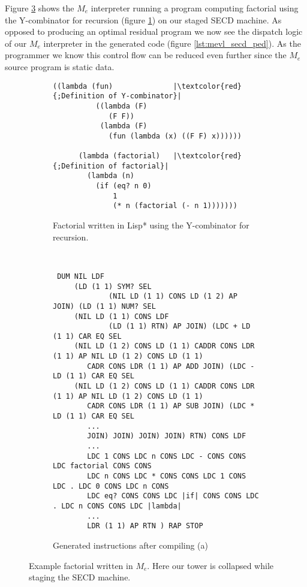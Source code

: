\documentclass[a4paper,12pt,twoside,openright]{report}
\theoremstyle{definition}
\newcommand{\mevl}{$M_{e}$}
\begin{document}
Figure \ref{lst:mevl_secd_all} shows the \mevl{} interpreter running a program computing factorial using the Y-combinator for recursion (figure \ref{lst:mevl_secd_lisp}) on our staged SECD machine. As opposed to producing an optimal residual program we now see the dispatch logic of our \mevl{} interpreter in the generated code (figure \ref{lst:mevl_secd_ped}). As the programmer we know this control flow can be reduced even further since the \mevl{} source program is static data.


\begin{figure}[htp!]
\centering
    \begin{subfigure}{.5\linewidth}
         \centering
         \begin{verbatim}
((lambda (fun)              |\textcolor{red}{;Definition of Y-combinator}|
          ((lambda (F)
             (F F))
           (lambda (F)
             (fun (lambda (x) ((F F) x))))))

      (lambda (factorial)   |\textcolor{red}{;Definition of factorial}|
        (lambda (n)
          (if (eq? n 0)
              1
              (* n (factorial (- n 1)))))))
         \end{verbatim}
         \caption{Factorial written in Lisp* using the Y-combinator for recursion.}
         \label{lst:mevl_secd_lisp}
    \end{subfigure}\\[1ex]
    \par\bigskip
    \begin{subfigure}{\linewidth}
         \centering
         \begin{verbatim}
 DUM NIL LDF
     (LD (1 1) SYM? SEL
             (NIL LD (1 1) CONS LD (1 2) AP JOIN) (LD (1 1) NUM? SEL
     (NIL LD (1 1) CONS LDF
             (LD (1 1) RTN) AP JOIN) (LDC + LD (1 1) CAR EQ SEL
     (NIL LD (1 2) CONS LD (1 1) CADDR CONS LDR (1 1) AP NIL LD (1 2) CONS LD (1 1)
        CADR CONS LDR (1 1) AP ADD JOIN) (LDC - LD (1 1) CAR EQ SEL
     (NIL LD (1 2) CONS LD (1 1) CADDR CONS LDR (1 1) AP NIL LD (1 2) CONS LD (1 1)
        CADR CONS LDR (1 1) AP SUB JOIN) (LDC * LD (1 1) CAR EQ SEL
        ...
        JOIN) JOIN) JOIN) JOIN) RTN) CONS LDF
        ...
        LDC 1 CONS LDC n CONS LDC - CONS CONS LDC factorial CONS CONS
        LDC n CONS LDC * CONS CONS LDC 1 CONS LDC . LDC 0 CONS LDC n CONS
        LDC eq? CONS CONS LDC |if| CONS CONS LDC . LDC n CONS CONS LDC |lambda|
        ...
        LDR (1 1) AP RTN ) RAP STOP
         \end{verbatim}
    \caption{Generated instructions after compiling (a)}
    \label{lst:mevl_secd_ops}
    \end{subfigure}
\caption{Example factorial written in \mevl. Here our tower is collapsed while staging the SECD machine.}
\label{lst:mevl_secd_all}
\end{figure}
\end{document}
